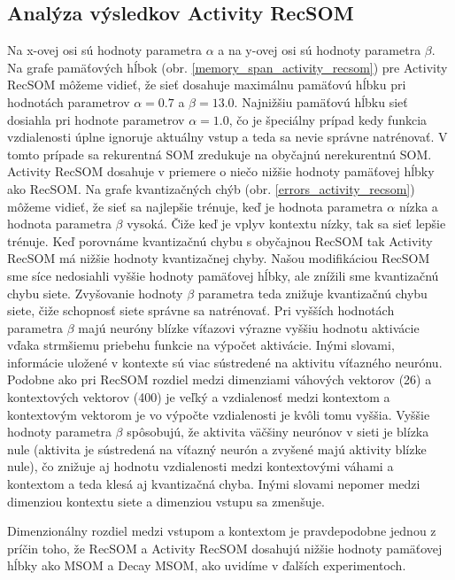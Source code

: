 \subsection{Analýza výsledkov Activity RecSOM}
Na x-ovej osi sú hodnoty parametra $\alpha$ a na y-ovej osi sú hodnoty parametra $\beta$.
Na grafe pamäťových hĺbok (obr. \ref{memory_span_activity_recsom}) pre Activity RecSOM môžeme vidieť, že sieť dosahuje 
maximálnu pamäťovú hĺbku pri hodnotách parametrov $\alpha = 0.7$ a $\beta = 13.0$.
Najnižšiu pamäťovú hĺbku sieť dosiahla pri hodnote parametrov  $\alpha = 1.0$, čo je špeciálny prípad
kedy funkcia vzdialenosti úplne ignoruje aktuálny vstup a teda sa nevie správne natrénovať. 
V tomto prípade sa rekurentná SOM zredukuje na obyčajnú nerekurentnú SOM. 
Activity RecSOM dosahuje v priemere o niečo nižšie hodnoty pamäťovej hĺbky ako RecSOM.
Na grafe kvantizačných chýb (obr. \ref{errors_activity_recsom}) môžeme vidieť, že sieť sa najlepšie trénuje, keď je hodnota 
parametra $\alpha$ nízka a hodnota parametra $\beta$ vysoká. Čiže keď je vplyv kontextu nízky, tak sa sieť lepšie trénuje.
Keď porovnáme kvantizačnú chybu s obyčajnou RecSOM tak Activity RecSOM má nižšie hodnoty kvantizačnej chyby. 
Našou modifikáciou RecSOM sme síce nedosiahli vyššie hodnoty pamäťovej hĺbky, ale znížili sme kvantizačnú chybu siete.
Zvyšovanie hodnoty $\beta$ parametra teda znižuje kvantizačnú chybu siete, čiže schopnosť siete správne sa natrénovať.
Pri vyšších hodnotách parametra $\beta$ majú neuróny blízke víťazovi výrazne vyššiu hodnotu aktivácie vďaka strmšiemu priebehu funkcie na výpočet aktivácie. 
Inými slovami, informácie uložené v kontexte sú viac sústredené na aktivitu víťazného neurónu. 
Podobne ako pri RecSOM rozdiel medzi dimenziami váhových vektorov (26) a kontextových vektorov (400) je veľký a vzdialenosť medzi kontextom a kontextovým vektorom
je vo výpočte vzdialenosti je kvôli tomu vyššia. Vyššie hodnoty parametra $\beta$ spôsobujú, že aktivita väčšiny neurónov v sieti je blízka nule (aktivita je sústredená na víťazný neurón a zvyšené majú aktivity blízke nule), čo znižuje aj hodnotu
vzdialenosti medzi kontextovými váhami a kontextom a teda klesá aj kvantizačná chyba. Inými slovami nepomer medzi dimenziou kontextu siete a dimenziou vstupu sa zmenšuje.

Dimenzionálny rozdiel medzi vstupom a kontextom je pravdepodobne jednou z príčin toho, že RecSOM a Activity RecSOM dosahujú nižšie hodnoty 
pamäťovej hĺbky ako MSOM a Decay MSOM, ako uvidíme v ďalších experimentoch.


